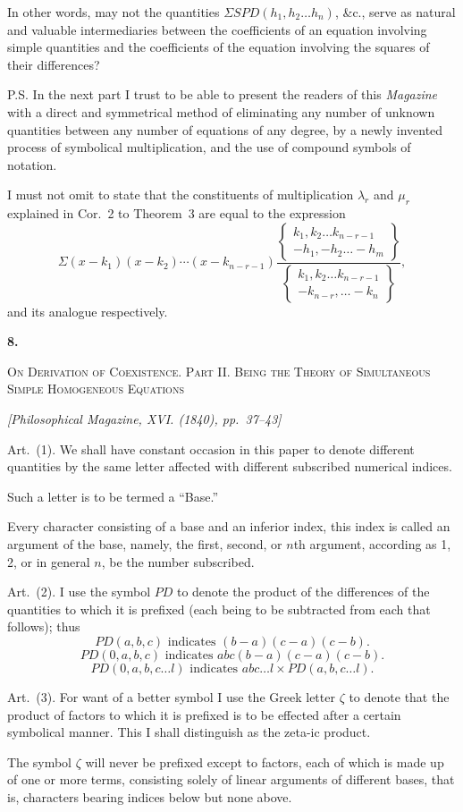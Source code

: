 \documentclass[11pt]{article}
\newcommand{\paperhead}[3]{%
  \clearpage
  \begin{center}
  {\Large\bfseries #1.}\par\vspace{0.85em}
  {\large\scshape #2}\par\vspace{0.6em}
  {\itshape [#3]}\par
  \end{center}\vspace{0.4em}}
\newcommand{\sourcepage}[1]{\marginpar{\scriptsize p.~#1}}
\newcommand{\art}[1]{\par\smallskip\noindent Art.~(#1).\quad}
\newcommand{\SPD}{\mathit{SPD}}
\newcommand{\PD}{\mathit{PD}}
\newcommand{\rowpair}[2]{\left\{\begin{matrix}#1\\#2\end{matrix}\right\}}
\begin{document}
In other words, may not the quantities $\Sigma\SPD(h_1,h_2\ldots h_n)$, \&c., serve as natural and valuable intermediaries between the coefficients of an equation involving simple quantities and the coefficients of the equation involving the squares of their differences?

P.S. In the next part I trust to be able to present the readers of this \emph{Magazine} with a direct and symmetrical method of eliminating any number of unknown quantities between any number of equations of any degree, by a newly invented process of symbolical multiplication, and the use of compound symbols of notation.

I must not omit to state that the constituents of multiplication $\lambda_r$ and $\mu_r$ explained in Cor.~2 to Theorem~3 are equal to the expression
\[
 \Sigma (x-k_1)(x-k_2)\cdots(x-k_{n-r-1})
 \frac{\rowpair{k_1,k_2\ldots k_{n-r-1}}{-h_1,-h_2\ldots -h_m}}
 {\rowpair{k_1,k_2\ldots k_{n-r-1}}{-k_{n-r},\ldots -k_n}},
\]
and its analogue respectively.

\paperhead{8}{On Derivation of Coexistence. Part II. Being the Theory of Simultaneous Simple Homogeneous Equations}{Philosophical Magazine, XVI. (1840), pp.~37--43}

\sourcepage{47}
\art{1} We shall have constant occasion in this paper to denote different quantities by the same letter affected with different subscribed numerical indices.

Such a letter is to be termed a ``Base.''

Every character consisting of a base and an inferior index, this index is called an argument of the base, namely, the first, second, or $n$th argument, according as 1, 2, or in general $n$, be the number subscribed.

\art{2} I use the symbol $\PD$ to denote the product of the differences of the quantities to which it is prefixed (each being to be subtracted from each that follows); thus
\[
 \PD(a,b,c) \text{ indicates } (b-a)(c-a)(c-b).
\]
\[
 \PD(0,a,b,c) \text{ indicates } abc(b-a)(c-a)(c-b).
\]
\[
 \PD(0,a,b,c\ldots l) \text{ indicates } abc\ldots l\times \PD(a,b,c\ldots l).
\]

\art{3} For want of a better symbol I use the Greek letter $\zeta$ to denote that the product of factors to which it is prefixed is to be effected after a certain symbolical manner. This I shall distinguish as the zeta-ic product.

The symbol $\zeta$ will never be prefixed except to factors, each of which is made up of one or more terms, consisting solely of linear arguments of different bases, that is, characters bearing indices below but none above.
\end{document}
